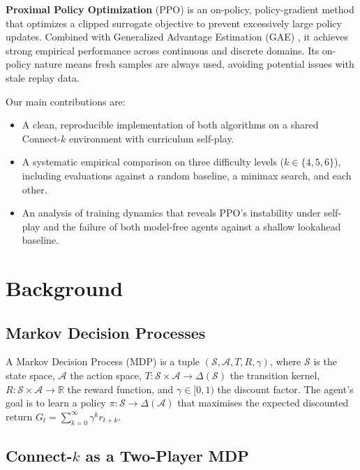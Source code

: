 \documentclass[10pt, letterpaper, twocolumn]{article}
\newcommand{\R}{\mathbb{R}}
\newcommand{\calA}{\mathcal{A}}
\newcommand{\calS}{\mathcal{S}}
\begin{document}
\textbf{Proximal Policy Optimization} (PPO) \citep{schulman2017ppo} is
an on-policy, policy-gradient method that optimizes a clipped surrogate
objective to prevent excessively large policy updates.  Combined with
Generalized Advantage Estimation (GAE) \citep{schulman2015gae}, it
achieves strong empirical performance across continuous and discrete
domains.  Its on-policy nature means fresh samples are always used,
avoiding potential issues with stale replay data.

Our main contributions are:
\begin{itemize}
  \item A clean, reproducible implementation of both algorithms on a
  shared Connect-$k$ environment with curriculum self-play.
  \item A systematic empirical comparison on three difficulty levels
  ($k \in \{4, 5, 6\}$), including evaluations against a random
  baseline, a minimax search, and each other.
  \item An analysis of training dynamics that reveals PPO's instability
  under self-play and the failure of both model-free agents against a
  shallow lookahead baseline.
\end{itemize}

\section{Background}
\label{sec:background}

\subsection{Markov Decision Processes}

A Markov Decision Process (MDP) is a tuple $(\calS, \calA, T, R, \gamma)$,
where $\calS$ is the state space, $\calA$ the action space, $T : \calS
\times \calA \to \Delta(\calS)$ the transition kernel, $R : \calS \times
\calA \to \R$ the reward function, and $\gamma \in [0,1)$ the discount
factor.  The agent's goal is to learn a policy $\pi : \calS \to
\Delta(\calA)$ that maximises the expected discounted return
$G_t = \sum_{k=0}^{\infty} \gamma^k r_{t+k}$.

\subsection{Connect-$k$ as a Two-Player MDP}
\end{document}
